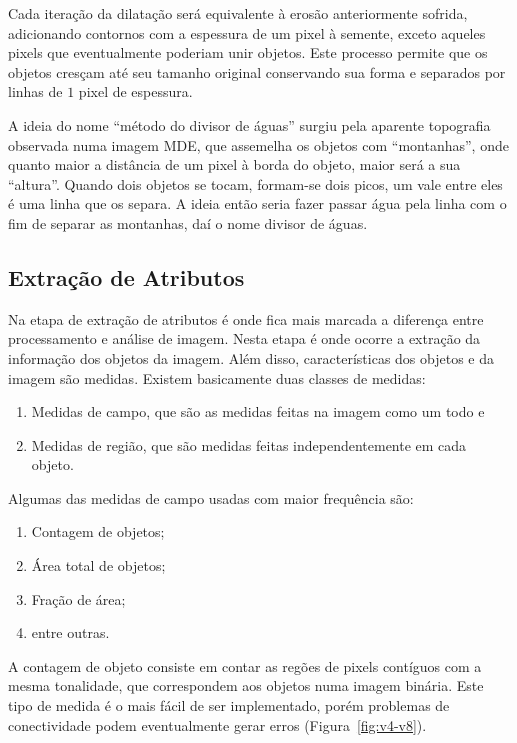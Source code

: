 Cada iteração da dilatação será equivalente à erosão anteriormente
sofrida, adicionando contornos com a espessura de um pixel à semente,
exceto aqueles pixels que eventualmente poderiam unir objetos. Este
processo permite que os objetos cresçam até seu tamanho original
conservando sua forma e separados por linhas de $1$ pixel de
espessura.

A ideia do nome ``método do divisor de águas'' surgiu pela aparente
topografia observada numa imagem MDE, que assemelha os objetos com
``montanhas'', onde quanto maior a distância de um pixel à borda do
objeto, maior será a sua ``altura''. Quando dois objetos se tocam,
formam-se dois picos, um vale entre eles é uma linha que os separa. A
ideia então seria fazer passar água pela linha com o fim de separar as
montanhas, daí o nome divisor de águas.

\subsection{Extração de Atributos}

Na etapa de extração de atributos é onde fica mais marcada a diferença
entre processamento e análise de imagem. Nesta etapa é onde ocorre a
extração da informação dos objetos da imagem. Além disso,
características dos objetos e da imagem são medidas.\cite{114} Existem
basicamente duas classes de medidas:

\begin{enumerate}[label=(\roman{*})]
  \item Medidas de campo, que são as medidas feitas na imagem
    como um todo e
  \item Medidas de região, que são medidas feitas independentemente em
    cada objeto.
\end{enumerate}

Algumas das medidas de campo usadas com maior frequência são:

\begin{enumerate}[label=$\triangleright$]
  \item Contagem de objetos;
  \item Área total de objetos;
  \item Fração de área;
  \item entre outras.
\end{enumerate}

A contagem de objeto consiste em contar as regões de pixels contíguos
com a mesma tonalidade, que correspondem aos objetos numa imagem
binária. Este tipo de medida é o mais fácil de ser implementado, porém
problemas de conectividade podem eventualmente gerar erros
(Figura~\ref{fig:v4-v8}).

